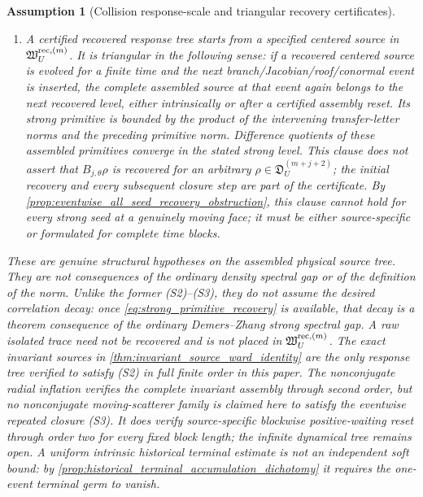 \documentclass[11pt]{amsart}
\theoremstyle{compactplain}
\theoremstyle{compactdefinition}
\newtheorem{assumption}[theorem]{Assumption}
\theoremstyle{compactremark}
\begin{document}
\begin{assumption}[Collision response-scale and triangular recovery certificates]
\begin{enumerate}[label=\textup{(S\arabic*)},wide,labelindent=0pt]
  \cref{thm:invariant_source_ward_identity} belong to this class with the
  explicit primitive \(\partial_s^j\rho_s\).  The radial inflation in
  \cref{thm:radial_inflation_second_order_recovery} verifies this cancellation
  at zero waiting time, while
  \cref{thm:blockwise_second_order_invariant_recovery} verifies the complete
  fixed-length block uniformly for arbitrary positive gaps through order two,
  and \cref{thm:uniform_postassembly_radial_tail,prop:certified_scalar_assembly_reset}
  close every radial fixed-length block in the scalar reset sense without
  (R3).  The separate
  \cref{lem:fixed_length_scalar_terminal_truncation} concerns only blocks for
  which (R3) has been certified.
  \item A \emph{certified recovered response tree} starts from a specified
  centered source in \(\mathfrak W_U^{{\rm rec},(m)}\).  It is triangular in
  the following sense: if a
  recovered centered source is evolved for a finite time and the next
  branch/Jacobian/roof/conormal event is inserted, the \emph{complete assembled
  source at that event} again belongs to the next recovered level, either
  intrinsically or after a certified assembly reset.  Its strong
  primitive is bounded by the product of the intervening transfer-letter norms
  and the preceding primitive norm.  Difference quotients of these assembled
  primitives converge in the stated strong level.  This clause does not assert
  that \(B_{j,\theta}\rho\) is recovered for an arbitrary
  \(\rho\in\mathfrak D_U^{(m+j+2)}\); the initial recovery and every subsequent
  closure step are part of the certificate.
  By \cref{prop:eventwise_all_seed_recovery_obstruction}, this clause cannot
  hold for every strong seed at a genuinely moving face; it must be either
  source-specific or formulated for complete time blocks.
\end{enumerate}
These are genuine structural hypotheses on the \emph{assembled} physical
source tree.  They are not consequences of the ordinary density spectral gap
or of the definition of the norm.  Unlike the former (S2)--(S3), they do not
assume the desired correlation decay: once
\eqref{eq:strong_primitive_recovery} is available, that decay is a theorem
consequence of the ordinary Demers--Zhang strong spectral gap.  A raw isolated
trace need not be recovered and is not placed in
\(\mathfrak W_U^{{\rm rec},(m)}\).  The exact invariant sources in
  \cref{thm:invariant_source_ward_identity} are the only response tree verified
  to satisfy (S2) in full finite order in this paper.  The nonconjugate radial
  inflation verifies the complete invariant assembly through second order,
  but no nonconjugate moving-scatterer family is claimed here to satisfy the
  eventwise repeated closure (S3).  It does verify source-specific blockwise
  positive-waiting reset through order two for every fixed block length; the
  infinite dynamical tree remains open.  A uniform intrinsic historical
  terminal estimate is not an independent soft bound: by
  \cref{prop:historical_terminal_accumulation_dichotomy} it requires the
  one-event terminal germ to vanish.
\end{assumption}
\end{document}
